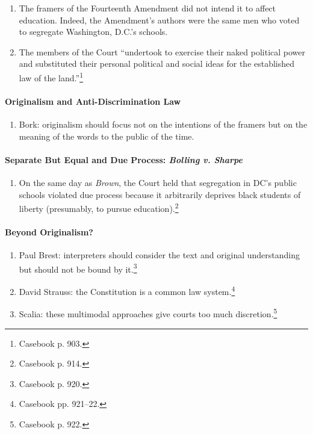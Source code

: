 \begin{enumerate}
    \item The framers of the Fourteenth Amendment did not intend it to affect 
    education. Indeed, the Amendment's authors were the same men who voted to 
    segregate Washington, D.C.'s schools.
    \item The members of the Court ``undertook to exercise their naked 
    political power and substituted their personal political and social ideas 
    for the established law of the land.''\footnote{Casebook p. 903.}
\end{enumerate}

\paragraph{Originalism and Anti-Discrimination Law}

\begin{enumerate}
    \item Bork: originalism should focus not on the intentions of the framers 
    but on the meaning of the words to the public of the time. 
\end{enumerate}

\paragraph{Separate But Equal and Due Process: \emph{Bolling v. Sharpe}}

\begin{enumerate}
    \item On the same day as \emph{Brown}, the Court held that segregation in 
    DC's public schools violated due process because it arbitrarily deprives 
    black students of liberty (presumably, to pursue 
    education).\footnote{Casebook p. 914.}
\end{enumerate}

\paragraph{Beyond Originalism?}

\begin{enumerate}
    \item Paul Brest: interpreters should consider the text and original 
    understanding but should not be bound by it.\footnote{Casebook p. 920.}
    \item David Strauss: the Constitution is a common law 
    system.\footnote{Casebook pp. 921--22.}
    \item Scalia: these multimodal approaches give courts too much 
    discretion.\footnote{Casebook p. 922.}
\end{enumerate}

